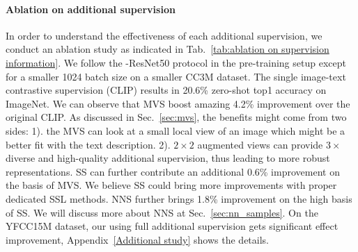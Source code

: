 \paragraph{Ablation on additional supervision}
In order to understand the effectiveness of each additional supervision, we conduct an ablation study as indicated in Tab.~\ref{tab:ablation on supervision information}. We follow the \workname-ResNet50 protocol in the pre-training setup except for a smaller 1024 batch size on a smaller CC3M dataset. The single image-text contrastive supervision (CLIP) results in 20.6\% zero-shot top1 accuracy on ImageNet. We can observe that MVS boost amazing 4.2\% improvement over the original CLIP. As discussed in Sec.~\ref{sec:mvs}, the benefits might come from two sides: 1). the MVS can look at a small local view of an image which might be a better fit with the text description. 2). $2\times2$ augmented views can provide $3\times$ diverse and high-quality additional supervision, thus leading to more robust representations. SS can further contribute an additional 0.6\% improvement on the basis of MVS. We believe SS could bring more improvements with proper dedicated SSL methods. NNS further brings 1.8\% improvement on the high basis of SS. We will discuss more about NNS at Sec.~\ref{sec:nn_samples}. On the YFCC15M dataset, our \workname using full additional supervision gets significant effect improvement, Appendix~\ref{Additional study} shows the details.



